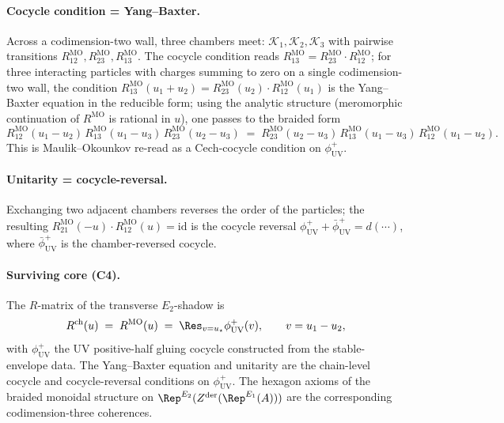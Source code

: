 \paragraph{Cocycle condition = Yang--Baxter.}  Across a codimension-two
wall, three chambers meet: $\mathcal{K}_1, \mathcal{K}_2, \mathcal{K}_3$
with pairwise transitions $R^{\mathrm{MO}}_{12}, R^{\mathrm{MO}}_{23},
R^{\mathrm{MO}}_{13}$.  The cocycle condition reads
$R^{\mathrm{MO}}_{13} = R^{\mathrm{MO}}_{23} \cdot R^{\mathrm{MO}}_{12}$;
for three interacting particles with charges summing to zero on a
single codimension-two wall, the condition
$R^{\mathrm{MO}}_{13}(u_1 + u_2) = R^{\mathrm{MO}}_{23}(u_2) \cdot
R^{\mathrm{MO}}_{12}(u_1)$ is the Yang--Baxter equation in the
reducible form; using the analytic structure (meromorphic
continuation of $R^{\mathrm{MO}}$ is rational in $u$), one passes to
the braided form
\[
 R^{\mathrm{MO}}_{12}(u_1 - u_2) \, R^{\mathrm{MO}}_{13}(u_1 - u_3) \,
 R^{\mathrm{MO}}_{23}(u_2 - u_3) \;=\;
 R^{\mathrm{MO}}_{23}(u_2 - u_3) \, R^{\mathrm{MO}}_{13}(u_1 - u_3) \,
 R^{\mathrm{MO}}_{12}(u_1 - u_2).
\]
This is Maulik--Okounkov \cite[Theorems~4.6.1 and 5.1.4]{MaulikOkounkov2012}
re-read as a $\mathrm{Cech}$-cocycle condition on
$\phi^+_{\mathrm{UV}}$.

\paragraph{Unitarity = cocycle-reversal.}  Exchanging two adjacent
chambers reverses the order of the particles; the resulting
$R^{\mathrm{MO}}_{21}(-u) \cdot R^{\mathrm{MO}}_{12}(u) = \mathrm{id}$
is the cocycle reversal $\phi^+_{\mathrm{UV}} + \bar\phi^+_{\mathrm{UV}}
= d(\cdots)$, where $\bar\phi^+_{\mathrm{UV}}$ is the chamber-reversed
cocycle.

\paragraph{Surviving core (C4).}  The $R$-matrix of the transverse
$E_2$-shadow is
\[
 R^{\mathrm{ch}}(u) \;=\; R^{\mathrm{MO}}(u)
 \;=\;
 \Res_{v = u_\star} \phi^+_{\mathrm{UV}}(v),
 \qquad
 v = u_1 - u_2,
\]
with $\phi^+_{\mathrm{UV}}$ the UV positive-half gluing cocycle
constructed from the stable-envelope data.  The Yang--Baxter equation
and unitarity are the chain-level cocycle and cocycle-reversal
conditions on $\phi^+_{\mathrm{UV}}$.  The hexagon axioms of the
braided monoidal structure on
$\Rep^{E_2}(Z^{\mathrm{der}}(\Rep^{E_1}(A)))$ are the corresponding
codimension-three coherences.



